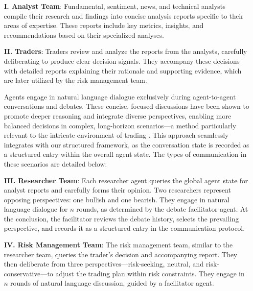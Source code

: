 \textbf{I. Analyst Team}: Fundamental, sentiment, news, and technical analysts compile their research and findings into concise analysis reports specific to their areas of expertise. These reports include key metrics, insights, and recommendations based on their specialized analyses.

\textbf{II. Traders}: Traders review and analyze the reports from the analysts, carefully deliberating to produce clear decision signals. They accompany these decisions with detailed reports explaining their rationale and supporting evidence, which are later utilized by the risk management team.

Agents engage in natural language dialogue exclusively during agent-to-agent conversations and debates. These concise, focused discussions have been shown to promote deeper reasoning and integrate diverse perspectives, enabling more balanced decisions in complex, long-horizon scenarios—a method particularly relevant to the intricate environment of trading \citep{du2023improvingfactualityreasoninglanguage}. This approach seamlessly integrates with our structured framework, as the conversation state is recorded as a structured entry within the overall agent state. The types of communication in these scenarios are detailed below:



\textbf{III. Researcher Team}: Each researcher agent queries the global agent state for analyst reports and carefully forms their opinion. Two researchers represent opposing perspectives: one bullish and one bearish. They engage in natural language dialogue for $n$ rounds, as determined by the debate facilitator agent. At the conclusion, the facilitator reviews the debate history, selects the prevailing perspective, and records it as a structured entry in the communication protocol.

\textbf{IV. Risk Management Team}: The risk management team, similar to the researcher team, queries the trader's decision and accompanying report. They then deliberate from three perspectives—risk-seeking, neutral, and risk-conservative—to adjust the trading plan within risk constraints. They engage in $n$ rounds of natural language discussion, guided by a facilitator agent.

